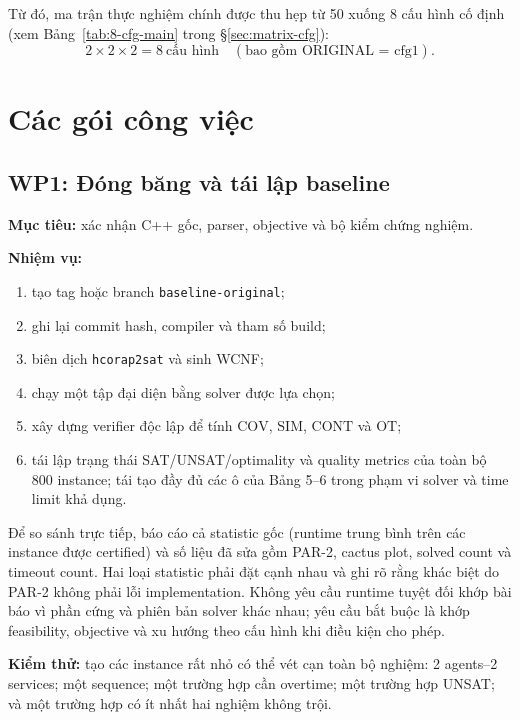 \documentclass[12pt,a4paper]{article}
\newcommand{\SIM}{\mathrm{SIM}}
\newcommand{\CONT}{\mathrm{CONT}}
\newcommand{\OT}{\mathrm{OT}}
\newcommand{\COV}{\mathrm{COV}}
\begin{document}
Từ đó, ma trận thực nghiệm chính được thu hẹp từ 50 xuống 8 cấu hình cố định
(xem Bảng~\ref{tab:8-cfg-main} trong \S\ref{sec:matrix-cfg}):
\begin{equation}
  2\times2\times2=8\ \text{cấu hình} \quad (\text{bao gồm ORIGINAL = cfg1}).
  \label{eq:8-config-matrix}
\end{equation}

\section{Các gói công việc}

\subsection{WP1: Đóng băng và tái lập baseline}

\textbf{Mục tiêu:} xác nhận C++ gốc, parser, objective và bộ kiểm chứng nghiệm.

\textbf{Nhiệm vụ:}
\begin{enumerate}
  \item tạo tag hoặc branch \texttt{baseline-original};
  \item ghi lại commit hash, compiler và tham số build;
  \item biên dịch \texttt{hcorap2sat} và sinh WCNF;
  \item chạy một tập đại diện bằng solver được lựa chọn;
  \item xây dựng verifier độc lập để tính $\COV$, $\SIM$, $\CONT$ và $\OT$;
  \item tái lập trạng thái SAT/UNSAT/optimality và quality metrics của toàn bộ
        800 instance; tái tạo đầy đủ các ô của Bảng 5--6 trong phạm vi solver
        và time limit khả dụng.
\end{enumerate}

Để so sánh trực tiếp, báo cáo cả statistic gốc (runtime trung bình trên các
instance được certified) và số liệu đã sửa gồm PAR-2, cactus plot, solved count
và timeout count. Hai loại statistic phải đặt cạnh nhau và ghi rõ rằng khác
biệt do PAR-2 không phải lỗi implementation. Không yêu cầu runtime tuyệt đối
khớp bài báo vì phần cứng và phiên bản solver khác nhau; yêu cầu bắt buộc là
khớp feasibility, objective và xu hướng theo cấu hình khi điều kiện cho phép.

\textbf{Kiểm thử:} tạo các instance rất nhỏ có thể vét cạn toàn bộ nghiệm:
2 agents--2 services; một sequence; một trường hợp cần overtime; một trường
hợp UNSAT; và một trường hợp có ít nhất hai nghiệm không trội.
\end{document}
